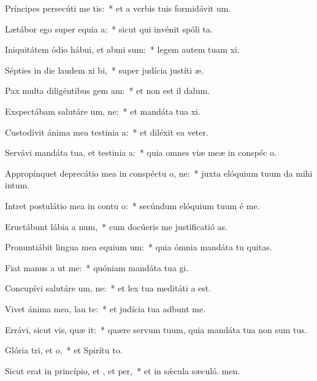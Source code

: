 \item Príncipes persecúti  me tis:~* et a verbis tuis formidávit  um.
\item Lætábor ego super equia a:~* sicut qui invénit spóli ta.
\item Iniquitátem ódio hábui, et abmi sum:~* legem autem tuam xi.
\item Sépties in die laudem xi bi,~* super judícia justíti æ.
\item Pax multa diligéntibus gem am:~* et non est il dalum.
\item Exspectábam salutáre um, ne:~* et mandáta tua xi.
\item Custodívit ánima mea testinia a:~* et diléxit ea veter.
\item Servávi mandáta tua, et testinia a:~* quia omnes viæ meæ in conspéc o.
\item Appropínquet deprecátio mea in conspéctu o, ne:~* juxta elóquium tuum da mihi intum.
\item Intret postulátio mea in contu o:~* secúndum elóquium tuum é me.
\item Eructábunt lábia a num,~* cum docúeris me justificatió as.
\item Pronuntiábit lingua mea equium um:~* quia ómnia mandáta tu quitas.
\item Fiat manus a ut  me:~* quóniam mandáta tua gi.
\item Concupívi salutáre um, ne:~* et lex tua meditáti a est.
\item Vivet ánima mea,  lau te:~* et judícia tua adbunt me.
\item Errávi, sicut vis, quæ it:~* quære servum tuum, quia mandáta tua non sum tus.
\item Glória tri, et o,~* et Spirítu to.
\item Sicut erat in princípio, et , et per,~* et in sǽcula sæculó. men.
